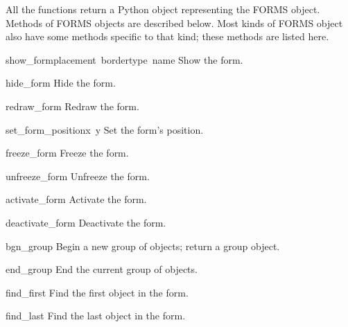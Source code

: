 All the  functions return a Python object representing
the FORMS object.  Methods of FORMS objects are described below.  Most
kinds of FORMS object also have some methods specific to that kind;
these methods are listed here.

\begin{flushleft}
\renewcommand{\indexsubitem}{(form object method)}
\begin{funcdesc}{show_form}{placement\, bordertype\, name}
  Show the form.
\end{funcdesc}

\begin{funcdesc}{hide_form}{}
  Hide the form.
\end{funcdesc}

\begin{funcdesc}{redraw_form}{}
  Redraw the form.
\end{funcdesc}

\begin{funcdesc}{set_form_position}{x\, y}
Set the form's position.
\end{funcdesc}

\begin{funcdesc}{freeze_form}{}
Freeze the form.
\end{funcdesc}

\begin{funcdesc}{unfreeze_form}{}
  Unfreeze the form.
\end{funcdesc}

\begin{funcdesc}{activate_form}{}
  Activate the form.
\end{funcdesc}

\begin{funcdesc}{deactivate_form}{}
  Deactivate the form.
\end{funcdesc}

\begin{funcdesc}{bgn_group}{}
  Begin a new group of objects; return a group object.
\end{funcdesc}

\begin{funcdesc}{end_group}{}
  End the current group of objects.
\end{funcdesc}

\begin{funcdesc}{find_first}{}
  Find the first object in the form.
\end{funcdesc}

\begin{funcdesc}{find_last}{}
  Find the last object in the form.
\end{funcdesc}


\end{flushleft}
